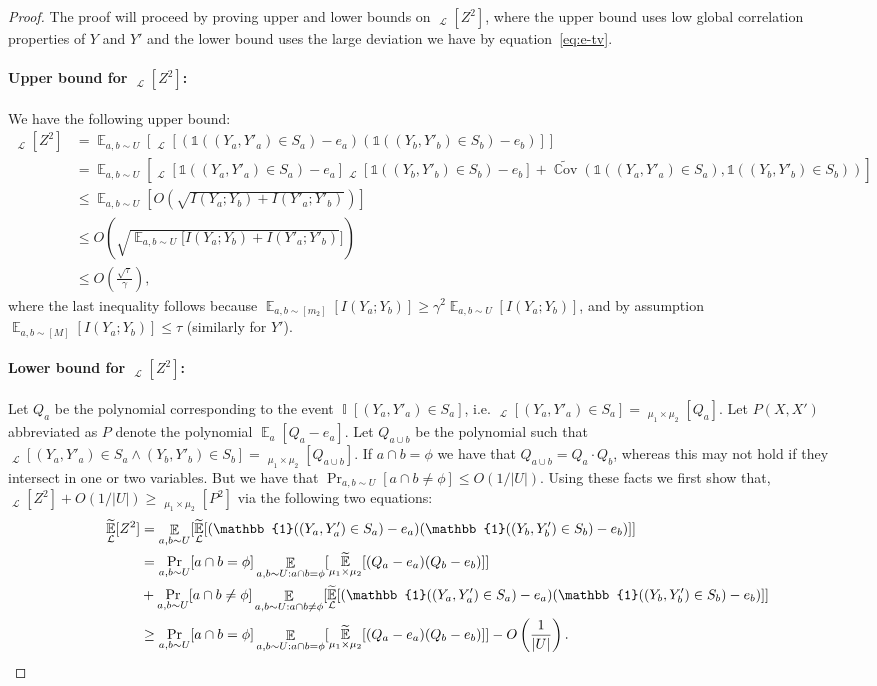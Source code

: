 \documentclass[11pt]{article}
\DeclareMathOperator*{\E}{\mathbb{E}}
\DeclareMathOperator*{\pE}{\widetilde{\mathbb{E}}}
\DeclareMathOperator*{\pPr}{\widetilde{\Pr}}
\DeclareMathOperator*{\Ind}{\mathbb{I}}
\DeclareMathOperator*{\Cov}{\mathbb{C}ov}
\def \cL {\mathcal{L}}
\def \one {\mathbb{1}}
\def \pCov {\widetilde{\Cov}}
\theoremstyle{definition}
\begin{document}
\begin{proof}
The proof will proceed by proving upper and lower bounds on $\pE_{\cL}[Z^2]$, where the upper bound uses low global correlation properties of $Y$ and $Y'$ and the lower bound uses the large deviation we have by equation~\ref{eq:e-tv}. 
\paragraph{Upper bound for $\pE_{\cL}[Z^2]$:}
We have the following upper bound:
\begin{align*}
\pE_{\cL}[Z^2] &= \E_{a,b \sim U}[\pE_{\cL}[(\one((Y_a,Y'_a) \in S_a) - e_a)(\one((Y_b,Y'_b) \in S_b) - e_b)]] \\
&= \E_{a,b \sim U}[\pE_{\cL}[\one((Y_a,Y'_a) \in S_a) - e_a]\pE_{\cL}[\one((Y_b,Y'_b) \in S_b) - e_b] + \pCov(\one((Y_a,Y'_a) \in S_a),\one((Y_b,Y'_b) \in S_b))] \\
&\leq \E_{a,b \sim U}[O(\sqrt{I(Y_a;Y_b) + I(Y'_a;Y'_b)})] \\
&\leq O(\sqrt{\E_{a,b \sim U}[I(Y_a;Y_b) + I(Y'_a;Y'_b)}])\\
&\leq O\left(\frac{\sqrt{\tau}}{\gamma}\right),
\end{align*}
where the last inequality follows because $\E_{a,b \sim [m_2]}[I(Y_a;Y_b)] \geq \gamma^2 \E_{a,b \sim U}[I(Y_a;Y_b)]$, and by assumption $\E_{a,b \sim [M]}[I(Y_a;Y_b)] \leq \tau$ (similarly for $Y'$).

\paragraph{Lower bound for $\pE_{\cL}[Z^2]$:}
Let $Q_a$ be the polynomial corresponding to the event $\Ind[(Y_a,Y'_a) \in S_a]$, i.e. $\pPr_{\cL}[(Y_a,Y'_a) \in S_a] = \pE_{\mu_1 \times \mu_2}[Q_a]$. Let $P(X,X')$ abbreviated as $P$ denote the polynomial $\E_a[Q_a - e_a]$. Let $Q_{a \cup b}$ be the polynomial such that $\pPr_{\cL}[(Y_a,Y'_a) \in S_a \wedge (Y_b,Y'_b) \in S_b] = \pE_{\mu_1 \times \mu_2}[Q_{a \cup b}]$. If $a \cap b = \phi$ we have that $Q_{a \cup b} = Q_a \cdot Q_b$, whereas this may not hold if they intersect in one or two variables. But we have that $\Pr_{a, b \sim U}[a \cap b \neq \phi] \leq O(1/|U|)$.
Using these facts we first show that, $\pE_{\cL}[Z^2]+O(1/|U|) \geq \pE_{\mu_1 \times \mu_2}[P^2]$ via the following two equations:
\begin{align}
\pE_{\cL}[Z^2] &= \E_{a,b \sim U}[\pE_{\cL}[(\one((Y_a,Y'_a) \in S_a) - e_a)(\one((Y_b,Y'_b) \in S_b) - e_b)]] \notag \\
&=\Pr_{a,b \sim U}[a \cap b = \phi]\E_{a,b \sim U: a\cap b=\phi}[\pE_{\mu_1 \times \mu_2}[(Q_{a} - e_a)(Q_b - e_b)]] \notag\\ &+ \Pr_{a,b \sim U}[a \cap b \neq \phi]\E_{a,b \sim U: a\cap b\neq \phi}[\pE_{\cL}[(\one((Y_a,Y'_a) \in S_a) - e_a)(\one((Y_b,Y'_b) \in S_b) - e_b)]] \notag \\
&\geq \Pr_{a,b \sim U}[a \cap b = \phi]\E_{a,b \sim U: a\cap b=\phi}[\pE_{\mu_1 \times \mu_2}[(Q_{a} - e_a)(Q_b - e_b)]] - O\left(\frac{1}{|U|}\right).\label{eq:z2-1}
\end{align}


\end{proof}
\end{document}
